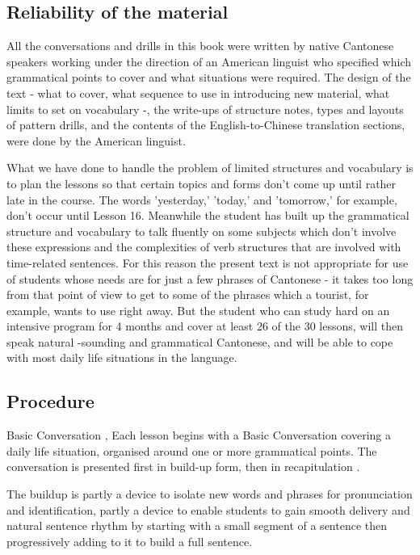 
\subsection{Reliability of the material}

All the conversations and drills in this book were written by native Cantonese speakers working under the direction of an American linguist who specified which grammatical points to cover and what situations were required. The design of the text - what to cover, what sequence to use in introducing new material, what limits to set on vocabulary -, the write-ups of structure notes, types and layouts of pattern drills, and the contents of the English-to-Chinese translation sections, were done by the American linguist.

What we have done to handle the problem of limited structures and vocabulary is to plan the lessons so that certain topics and forms don't come up until rather late in the course. The words 'yesterday,' 'today,' and 'tomorrow,' for example, don't occur until Lesson 16. Meanwhile the student has built up the grammatical structure and vocabulary to talk fluently on some subjects which don't involve these expressions and the complexities of verb structures that are involved with time-related sentences. For this reason the present text is not appropriate for use of students whose needs are for just a few phrases of Cantonese - it takes too long from that point of view to get to some of the phrases which a tourist, for example, wants to use right away. But the student who can study hard on an intensive program for 4 months and cover at least 26 of the 30 lessons, will then speak natural -sounding and grammatical Cantonese, and will be able to cope with most daily life situations in the language.


\subsection{Procedure}

Basic Conversation , Each lesson begins with a Basic Conversation covering a daily life situation, organised around one or more grammatical points. The conversation is presented first in build-up form, then in recapitulation .

The buildup is partly a device to isolate new words and phrases for pronunciation and identification, partly a device to enable students to gain smooth delivery and natural sentence rhythm by starting with a small segment of a sentence then progressively adding to it to build a full sentence.

